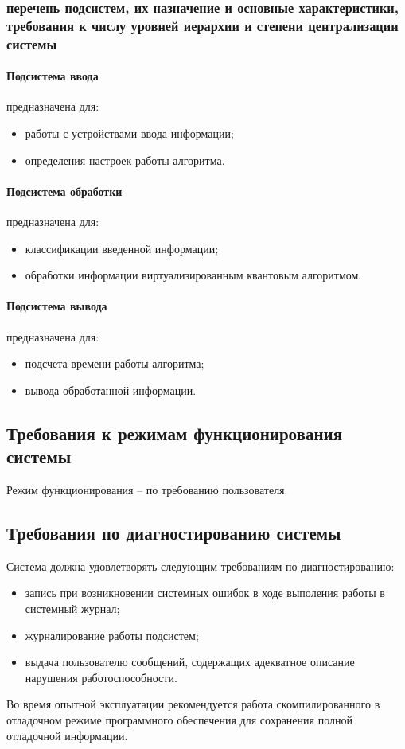 \subsubsection{перечень подсистем, их назначение и основные характеристики,
требования к числу уровней иерархии и степени централизации системы}
\paragraph{Подсистема ввода}
предназначена для:
\begin{itemize}
  \item работы с устройствами ввода информации;
  \item определения настроек работы алгоритма.
\end{itemize}

\paragraph{Подсистема обработки}
предназначена для:
\begin{itemize}
  \item классификации введенной информации;
  \item обработки информации виртуализированным квантовым алгоритмом.
\end{itemize}

\paragraph{Подсистема вывода}
предназначена для:
\begin{itemize}
  \item подсчета времени работы алгоритма;
  \item вывода обработанной информации.
\end{itemize}

\subsection{Требования к режимам функционирования системы}
Режим функционирования -- по требованию пользователя.

\subsection{Требования по диагностированию системы}
Система должна удовлетворять следующим требованиям по диагностированию:
\begin{itemize}
  \item запись при возникновении системных ошибок в ходе выполения работы
    в системный журнал;
  \item журналирование работы подсистем;
  \item выдача пользователю сообщений, содержащих адекватное описание нарушения
    работоспособности.
\end{itemize}
Во время опытной эксплуатации рекомендуется работа скомпилированного в
отладочном режиме программного обеспечения для сохранения полной отладочной
информации.

